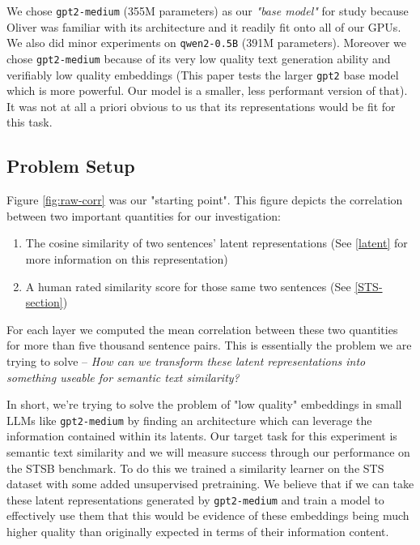\documentclass{article}
\begin{document}
\begin{enumerate}
\end{enumerate}
We chose \verb|gpt2-medium| (355M parameters) as our \textit{"base model"} for study because Oliver was familiar with its architecture and it readily fit onto all of our GPUs. We also did minor experiments on \verb|qwen2-0.5B| (391M parameters). Moreover we chose \verb|gpt2-medium| because of its very low quality text generation ability and verifiably low quality embeddings \cite{ethayarajh2019contextualcontextualizedwordrepresentations} (This paper tests the larger \verb|gpt2| base model which is more powerful. Our model is a smaller, less performant version of that). It was not at all a priori obvious to us that its representations would be fit for this task.


\subsection{Problem Setup} \label{Setup}
Figure \ref{fig:raw-corr} was our "starting point". This figure depicts the correlation between two important quantities for our investigation:
\begin{enumerate}
    \item The cosine similarity of two sentences' latent representations (See \ref{latent} for more information on this representation)
    \item A human rated similarity score for those same two sentences (See \ref{STS-section})
\end{enumerate}
For each layer we computed the mean correlation between these two quantities for more than five thousand sentence pairs. This is essentially the problem we are trying to solve -- \textit{How can we transform these latent representations into something useable for semantic text similarity?}

In short, we're trying to solve the problem of "low quality" embeddings in small LLMs like \verb|gpt2-medium| by finding an architecture which can leverage the information contained within its latents. Our target task for this experiment is semantic text similarity and we will measure success through our performance on the STSB \cite{STS} benchmark. To do this we trained a similarity learner on the STS dataset with some added unsupervised pretraining. We believe that if we can take these latent representations generated by \verb|gpt2-medium| and train a model to effectively use them that this would be evidence of these embeddings being much higher quality than originally expected in terms of their information content.
\end{document}
